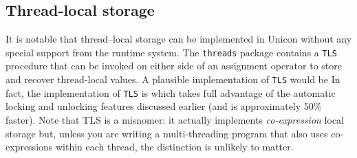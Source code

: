 \subsection*{Thread-local storage}
It is notable that thread--local storage can be implemented in Unicon without
any special support from the runtime system. The \texttt{threads} package
contains a \texttt{TLS}  procedure that can be invoked on either side of an assignment
operator to store and recover thread-local values. A plausible implementation of
\texttt{TLS} would be
\noindent
In fact, the implementation of \texttt{TLS} is
\noindent
which takes full advantage of the automatic locking and unlocking features
discussed earlier (and is approximately 50\% faster).
Note that TLS is a misnomer: it actually implements {\em co-expression} local
storage but, unless you are writing a multi-threading program that also uses
co-expressions within each thread, the distinction is unlikely to matter.


